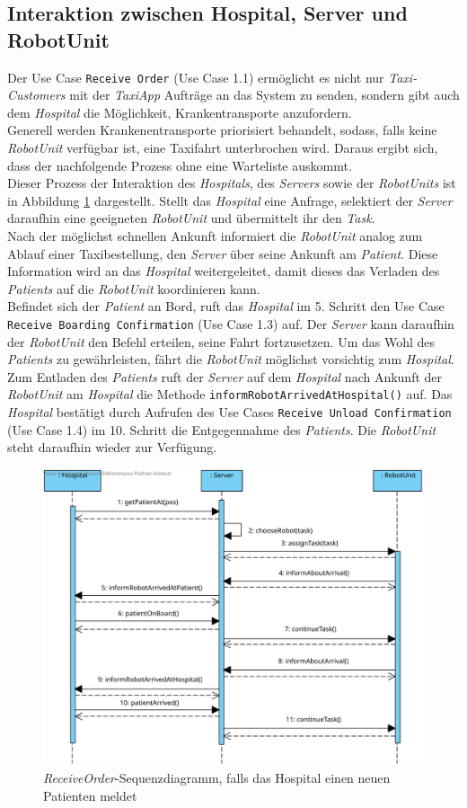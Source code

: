 \subsection*{Interaktion zwischen Hospital, Server und RobotUnit}
Der Use Case \texttt{Receive Order} (Use Case 1.1) ermöglicht es nicht nur \emph{Taxi-Customers} mit der \emph{TaxiApp} Aufträge an das System zu senden, sondern gibt auch dem \emph{Hospital} die Möglichkeit, Krankentransporte anzufordern. \\
Generell werden Krankenentransporte priorisiert behandelt, sodass, falls keine \emph{RobotUnit} verfügbar ist, eine Taxifahrt unterbrochen wird. Daraus ergibt sich, dass der nachfolgende Prozess ohne eine Warteliste auskommt. \\
Dieser Prozess der Interaktion des \emph{Hospitals}, des \emph{Servers} sowie der \emph{RobotUnits} ist in Abbildung \ref{SequenzDiagrammInteraktionHospital} dargestellt.
Stellt das \emph{Hospital} eine Anfrage, selektiert der \emph{Server} daraufhin eine geeigneten \emph{RobotUnit} und übermittelt ihr den \emph{Task}. \\
Nach der möglichst schnellen Ankunft informiert die \emph{RobotUnit} analog zum Ablauf einer Taxibestellung, den \emph{Server} über seine Ankunft am \emph{Patient}. Diese Information wird an das \emph{Hospital} weitergeleitet, damit dieses das Verladen des \emph{Patients} auf die \emph{RobotUnit} koordinieren kann. \\
Befindet sich der \emph{Patient} an Bord, ruft das \emph{Hospital} im 5. Schritt den Use Case \texttt{Receive Boarding Confirmation} (Use Case 1.3) auf. Der \emph{Server} kann daraufhin der \emph{RobotUnit} den Befehl erteilen, seine Fahrt fortzusetzen. Um das Wohl des \emph{Patients} zu gewährleisten, fährt die \emph{RobotUnit} möglichst vorsichtig zum \emph{Hospital}. \\
Zum Entladen des \emph{Patients} ruft der \emph{Server} auf dem \emph{Hospital} nach Ankunft der \emph{RobotUnit} am \emph{Hospital} die Methode \texttt{informRobotArrivedAtHospital()} auf. Das \emph{Hospital} bestätigt durch Aufrufen des Use Cases \texttt{Receive Unload Confirmation} (Use Case 1.4) im 10. Schritt die Entgegennahme des \emph{Patients}. Die \emph{RobotUnit} steht daraufhin wieder zur Verfügung.
\begin{figure}[H]
	\centering
	\includegraphics[width=1\textwidth]{img/2-Entwurf-ReceiveOrder-Hosp}
	\caption{\emph{ReceiveOrder}-Sequenzdiagramm, falls das Hospital einen neuen Patienten meldet}
	\label{SequenzDiagrammInteraktionHospital}
\end{figure}


